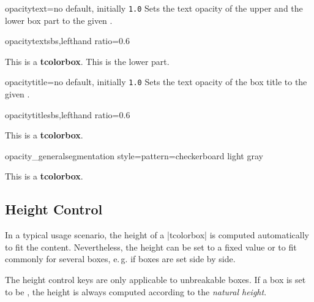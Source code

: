 \begin{docTcbKey}{opacitytext}{=}{no default, initially \texttt{1.0}}
  Sets the text opacity of the upper and the lower box part to the given .
\begin{exdispExample*}{opacitytext}{sbs,lefthand ratio=0.6}
\begin{tcolorbox}[enhanced,opacitytext=0.5,
  interior style={pattern=checkerboard light gray}]
This is a \textbf{tcolorbox}.
\tcblower
This is the lower part.
\end{tcolorbox}
\end{exdispExample*}
\end{docTcbKey}


\begin{docTcbKey}{opacitytitle}{=}{no default, initially \texttt{1.0}}
  Sets the text opacity of the box title to the given .
\begin{exdispExample*}{opacitytitle}{sbs,lefthand ratio=0.6}
\begin{tcolorbox}[enhanced,opacitytitle=0.7,
  coltitle=black,
  fonttitle=\bfseries,title=This is a title,
  title style={pattern=checkerboard light gray}]
This is a \textbf{tcolorbox}.
\end{tcolorbox}
\end{exdispExample*}
\end{docTcbKey}


\begin{exdispExample*}{opacity_general}{segmentation style={pattern=checkerboard light gray}}
\begin{tcolorbox}[enhanced jigsaw,fonttitle=\bfseries,title=This is a title,
  opacityframe=0.5,opacityback=0.25,opacitybacktitle=0.25,opacitytext=0.8,
  colback=red!5!white,colframe=red!75!black,colbacktitle=yellow!20!red]
This is a \textbf{tcolorbox}.
\end{tcolorbox}
\end{exdispExample*}



\clearpage
\subsection{Height Control}\label{sec:heightcontrol}
In a typical usage scenario, the height of a |tcolorbox| is computed automatically
to fit the content. Nevertheless, the height can be set to a fixed value
or to fit commonly for several boxes, e.\,g. if boxes are set side by side.

\bigskip
\begin{marker}
  The height control keys are only applicable to unbreakable boxes.
  If a box is set to be , the height is always
  computed according to the \emph{natural height}.
\end{marker}
\bigskip


